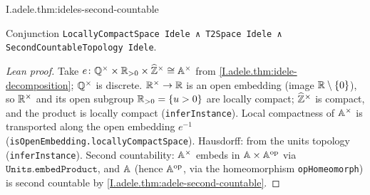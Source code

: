 \begin{theorem}
\end{theorem}
\begin{tfformal}{I.adele.thm:ideles-second-countable}
\begin{tffidelity}
Conjunction \texttt{LocallyCompactSpace Idele ∧ T2Space Idele ∧ SecondCountableTopology Idele}.
\end{tffidelity}
\end{tfformal}
\begin{proof}[Lean proof]
Take $e\colon\mathbb{Q}^\times\times\mathbb{R}_{>0}\times\widehat{\mathbb{Z}}^\times\cong\mathbb{A}^\times$ from \cref{I.adele.thm:idele-decomposition}; $\mathbb{Q}^\times$ is discrete. $\mathbb{R}^\times\to\mathbb{R}$ is an open embedding (image $\mathbb{R}\setminus\{0\}$), so $\mathbb{R}^\times$ and its open subgroup $\mathbb{R}_{>0}=\{u>0\}$ are locally compact; $\widehat{\mathbb{Z}}^\times$ is compact, and the product is locally compact (\texttt{inferInstance}). Local compactness of $\mathbb{A}^\times$ is transported along the open embedding $e^{-1}$ (\texttt{isOpenEmbedding.locallyCompactSpace}). Hausdorff: from the units topology (\texttt{inferInstance}). Second countability: $\mathbb{A}^\times$ embeds in $\mathbb{A}\times\mathbb{A}^{\mathrm{op}}$ via $\texttt{Units.embedProduct}$, and $\mathbb{A}$ (hence $\mathbb{A}^{\mathrm{op}}$, via the homeomorphism \texttt{opHomeomorph}) is second countable by \cref{I.adele.thm:adele-second-countable}.
\end{proof}

